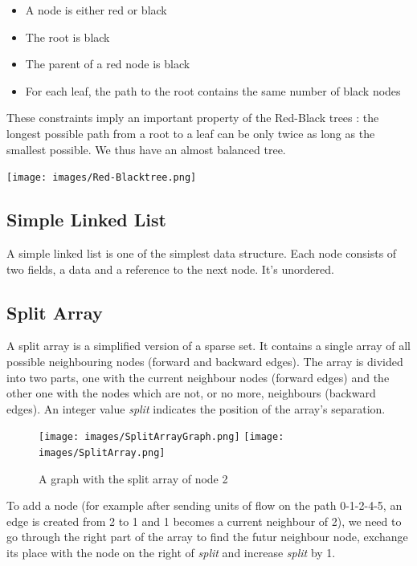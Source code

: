 \begin{itemize}
\item A node is either red or black
\item The root is black
\item The parent of a red node is black
\item For each leaf, the path to the root contains the same number of black nodes
\end{itemize}

These constraints imply an important property of the Red-Black trees : the longest possible path from a root to a leaf can be only twice as long as the smallest possible. We thus have an almost balanced tree.

\begin{center}
\texttt{[image: images/Red-Blacktree.png]}
\end{center}

\subsection{Simple Linked List}
A simple linked list is one of the simplest data structure. Each node consists of two fields, a data and a reference to the next node. It's unordered.

\subsection{Split Array}
A split array is a simplified version of a sparse set. It contains a single array of all possible neighbouring nodes (forward and backward edges). The array is divided into two parts, one with the current neighbour nodes (forward edges) and the other one with the nodes which are not, or no more, neighbours (backward edges). An integer value \textit{split} indicates the position of the array's separation.

\begin{figure}[!h]
\texttt{[image: images/SplitArrayGraph.png]}\hfill
\texttt{[image: images/SplitArray.png]}
\caption{A graph with the split array of node 2}
\end{figure}

To add a node (for example after sending units of flow on the path 0-1-2-4-5, an edge is created from 2 to 1 and 1 becomes a current neighbour of 2), we need to go through the right part of the array to find the futur neighbour node, exchange its place with the node on the right of \textit{split} and increase \textit{split} by 1. \newline

